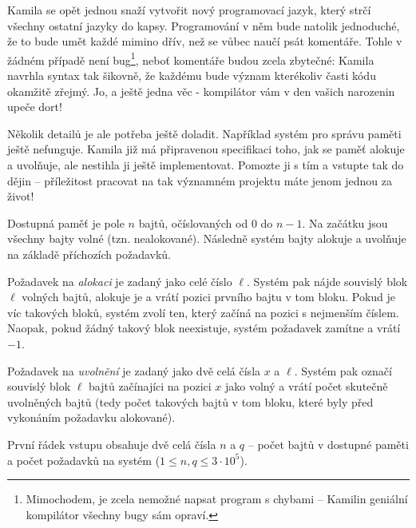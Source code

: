 





Kamila se opět jednou snaží vytvořit nový programovací jazyk, který strčí
všechny ostatní jazyky do kapsy. Programování v něm bude natolik jednoduché,
že to bude umět každé mimino dřív, než se vůbec naučí psát komentáře.
Tohle v žádném případě není bug\footnote{Mimochodem, je zcela nemožné napsat program s chybami --
Kamilin geniální kompilátor všechny bugy sám opraví.},
neboť komentáře budou zcela zbytečné: Kamila navrhla syntax tak šikovně, že každému
bude význam kterékoliv časti kódu okamžitě zřejmý. Jo, a ještě jedna věc -
kompilátor vám v den vašich narozenin upeče dort!

Několik detailů je ale potřeba ještě doladit. Například systém pro správu
paměti ještě nefunguje. Kamila již má připravenou specifikaci toho, jak se
paměť alokuje a uvolňuje, ale nestihla ji ještě implementovat. Pomozte ji s tím
a vstupte tak do dějin -- příležitost pracovat na tak významném projektu máte
jenom jednou za život!



Dostupná paměť je pole $n$ bajtů, očíslovaných od $0$ do $n-1$.
Na začátku jsou všechny bajty volné (tzn. nealokované).
Následně systém bajty alokuje a uvolňuje na základě příchozích požadavků.

Požadavek na \emph{alokaci} je zadaný jako celé číslo $\ell$.
Systém pak nájde souvislý blok $\ell$ volných bajtů, alokuje je a vrátí pozici
prvního bajtu v tom bloku. Pokud je víc takových bloků, systém zvolí ten,
který začíná na pozici s nejmenším číslem. Naopak, pokud žádný takový blok
neexistuje, systém požadavek zamítne a vrátí $-1$.

Požadavek na \emph{uvolnění} je zadaný jako dvě celá čísla $x$ a $\ell$.
Systém pak označí souvislý blok $\ell$ bajtů začínajíci na pozici $x$ jako
volný a vrátí počet skutečně uvolněných bajtů (tedy počet takových bajtů v
tom bloku, které byly před vykonáním požadavku alokované).



První řádek vstupu obsahuje dvě celá čísla $n$ a $q$ -- počet bajtů v dostupné
paměti a počet požadavků na systém ($1 \leq n, q \leq 3\cdot 10^5$).

